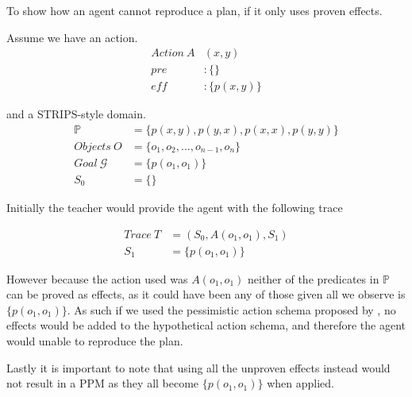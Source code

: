 \documentclass[../Master.tex]{subfiles}
\begin{document}
	\begin{example}
		To show how an agent cannot reproduce a plan, if it only uses proven effects.
		
		Assume we have an action.
		\begin{equation*}
			\begin{split}
				Action ~ A &(x, y) \\
					pre&: \{\} \\
					eff&: \{p(x,y)\}			
			\end{split}
		\end{equation*}
		
		and a STRIPS-style domain.
		\begin{equation*}
			\begin{split}
				\mathbb{P} &= \{p(x,y), p(y,x), p(x,x), p(y,y)\}		\\
				Objects~O &= \{o_1,o_2,...,o_{n-1},o_n\} \\
				Goal~\mathcal{G} &= \{p(o_1,o_1)\} \\
				S_0 &=\{\}
			\end{split}
		\end{equation*}
		
		Initially the teacher would provide the agent with the following trace
		
		\begin{equation*}
			\begin{split}				
				Trace~T &= (S_0,A(o_1,o_1),S_1) \\
				S_1 &= \{p(o_1,o_1)\}				
			\end{split}
		\end{equation*}
		
		However because the action used was $A(o_1,o_1)$ neither of the predicates in $\mathbb{P}$ can be proved as effects, as it could have been any of those given all we observe is $\{p(o_1,o_1)\}$. 
		As such if we used the pessimistic action schema proposed by \cite{Walsh2008}, no effects would be added to the hypothetical action schema, and therefore the agent would unable to reproduce the plan. 
		
		Lastly it is important to note that using all the unproven effects instead would not result in a PPM as they all become $\{p(o_1,o_1)\}$ when applied.
		
	\end{example}
	
\end{document}
